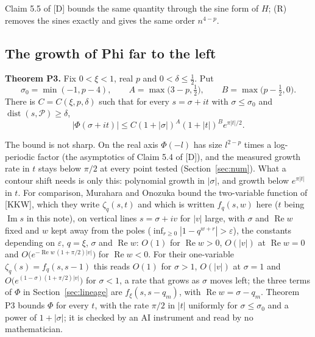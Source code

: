 \documentclass[11pt]{article}
\newcommand{\re}{\operatorname{Re}}
\newcommand{\im}{\operatorname{Im}}
\newcommand{\dist}{\operatorname{dist}}
\begin{document}
Claim 5.5 of [D] bounds the same quantity through the sine form of $H$; (R) removes the sines exactly and gives the same order $n^{4-p}$.

\subsection{The growth of Phi far to the left}

\noindent\textbf{Theorem P3.} Fix $0<\xi<1$, real $p$ and $0<\delta\le\frac12$. Put
\[
\sigma_0=\min(-1,p-4),\qquad A=\max\bigl(3-p,\tfrac12\bigr),\qquad B=\max\bigl(p-\tfrac12,0\bigr).
\]
There is $C=C(\xi,p,\delta)$ such that for every $s=\sigma+it$ with $\sigma\le\sigma_0$ and $\dist(s,\mathcal{P})\ge\delta$,
\[
|\Phi(\sigma+it)|\le C(1+|\sigma|)^A(1+|t|)^Be^{\pi|t|/2}.
\]

The bound is not sharp. On the real axis $\Phi(-l)$ has size $l^{2-p}$ times a log-periodic factor (the asymptotics of Claim 5.4 of [D]), and the measured growth rate in $t$ stays below $\pi/2$ at every point tested (Section~\ref{sec:num}). What a contour shift needs is only this: polynomial growth in $|\sigma|$, and growth below $e^{\pi|t|}$ in $t$. For comparison, Murahara and Onozuka \cite[Theorem~1.1 and Corollary~1.2]{MO} bound the two-variable function of [KKW], which they write $\zeta_q(s,t)$ and which is written $f_q(s,w)$ here ($t$ being $\im s$ in this note), on vertical lines $s=\sigma+iv$ for $|v|$ large, with $\sigma$ and $\re w$ fixed and $w$ kept away from the poles ($\inf_{r\ge0}|1-q^{w+r}|>\varepsilon$), the constants depending on $\varepsilon$, $q=\xi$, $\sigma$ and $\re w$: $O(1)$ for $\re w>0$, $O(|v|)$ at $\re w=0$ and $O\bigl(e^{-\re w\,(1+\pi/2)|v|}\bigr)$ for $\re w<0$. For their one-variable $\zeta_q(s)=f_q(s,s-1)$ this reads $O(1)$ for $\sigma>1$, $O(|v|)$ at $\sigma=1$ and $O\bigl(e^{(1-\sigma)(1+\pi/2)|v|}\bigr)$ for $\sigma<1$, a rate that grows as $\sigma$ moves left; the three terms of $\Phi$ in Section~\ref{sec:lineage} are $f_\xi(s,s-q_m)$, with $\re w=\sigma-q_m$. Theorem P3 bounds $\Phi$ for every $t$, with the rate $\pi/2$ in $|t|$ uniformly for $\sigma\le\sigma_0$ and a power of $1+|\sigma|$; it is checked by an AI instrument and read by no mathematician.
\end{document}
